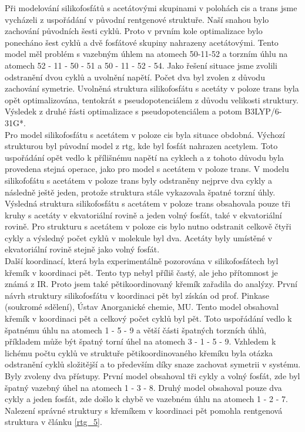 \documentclass[
  digital, %
  table,   %
  lof,     %
  lot,     %
  oneside,
]{fithesis3}
\begin{document}
Při modelování silikofosfátů s acetátovými skupinami v polohách cis a trans jsme vycházeli z uspořádání v původní rentgenové struktuře. Naší snahou bylo zachování původních šesti cyklů. Proto v prvním kole optimalizace bylo ponecháno šest cyklů a dvě fosfátové skupiny nahrazeny acetátovými. Tento model měl problém s vazebným úhlem na atomech 50-11-52 a torzním úhlu na atomech 52 - 11 - 50 - 51 a 50 - 11 - 52 - 54. Jako řešení situace jsme zvolili odstranění dvou cyklů a uvolnění napětí. Počet dva byl zvolen z důvodu zachování symetrie. Uvolněná struktura silikofosfátu s acetáty v poloze trans byla opět optimalizována, tentokrát s pseudopotenciálem z důvodu velikosti struktury. Výsledek z druhé řásti optimalizace s pseudopotenciálem a potom B3LYP/6-31G*. \\
Pro model silikofosfátu s acetátem v poloze cis byla situace obdobná. Výchozí strukturou byl původní model z rtg, kde byl fosfát nahrazen acetylem. Toto uspořádání opět vedlo k přílišnému napětí na cyklech a z tohoto důvodu byla provedena stejná operace, jako pro model s acetátem v poloze trans. V modelu silikofofátu s acetátem v poloze trans byly odstraněny nejprve dva cykly a následně ještě jeden, protože struktura stále vykazovala špatné torzní úhly. Výsledná struktura silikofosfátu s acetátem v poloze trans obsahovala pouze tři kruhy s acetáty v ekvatoriální rovině a jeden volný fosfát, také v ekvatoriální rovině.
Pro strukturu s acetátem v poloze cis bylo nutno odstranit celkově čtyři cykly a výsledný počet cyklů v molekule byl dva. Acetáty byly umístěné v ekvatoriální rovině stejně jako volný fosfát. \\
Další koordinací, která byla experimentálně pozorována v silikofosfátech byl křemík v koordinaci pět. Tento typ nebyl příliš častý, ale jeho přítomnost je známá z IR. Proto jsem také pětikoordinovaný křemík zařadila do analýzy. První návrh struktury silikofosfátu v koordinaci pět byl získán od prof. Pinkase (soukromé sdělení), Ústav Anorganické chemie, MU. Tento model obsahoval křemík v koordinaci pět a celkový počet cyklů byl pět. Toto uspořádání vedlo k špatnému úhlu na atomech 1 - 5 - 9 a větší části špatných torzních úhlů, příkladem může být špatný torní úhel na atomech 3 - 1 - 5 - 9.  Vzhledem k lichému počtu cyklů ve struktuře pětikoordinovaného křemíku byla otázka odstranění cyklů složitější a to především díky snaze zachovat symetrii v systému. Byly zvoleny dva přístupy. První model obsahoval tři cykly a volný fosfát, zde byl špatný vazebný úhel na atomech 1 - 3 - 8. Druhý model obsahoval pouze dva cykly a jeden fosfát, zde došlo k chybě ve vazebném úhlu na atomech 1 - 2 - 7. Nalezení správné struktury s křemíkem v koordinaci pět pomohla rentgenová struktura v článku \cite{rtg_5} \ref{rtg_5}.
\end{document}

